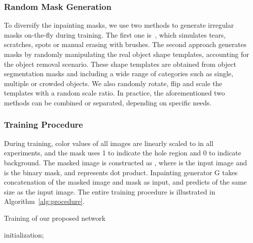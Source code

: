 \documentclass[oribibl]{llncs}  \usepackage[width=122mm,left=12mm,paperwidth=146mm,height=193mm,top=12mm,paperheight=217mm]{geometry}
\begin{document}
\subsubsection{Random Mask Generation}
To diversify the inpainting masks, we use two methods to generate irregular masks on-the-fly during training. The first one is~\cite{liu2018image}, which simulates tears, scratches, spots or manual erasing with brushes. The second approach generates masks by randomly manipulating the real object shape templates, accounting for the object removal scenario. These shape templates are obtained from object segmentation masks and including a wide range of categories such as single, multiple or crowded objects. We also randomly rotate, flip and scale the templates with a random scale ratio. In practice, the aforementioned two methods can be combined or separated, depending on specific needs.

\subsubsection{Training Procedure}
During training, color values of all images are linearly scaled to  in all experiments, and the mask uses 1 to indicate the hole region and 0 to indicate background. The masked image is constructed as , where  is the input image and  is the binary mask, and  represents dot product. Inpainting generator G takes concatenation of the masked image and mask as input, and predicts  of the same size as the input image. The entire training procedure is illustrated in Algorithm~\ref{alg:procedure}.

\begin{algorithm}
	\small
	\caption{Training of our proposed network}
	\label{alg:procedure}
	\SetAlgoLined
	initialization; \\
\end{algorithm}
\end{document}
